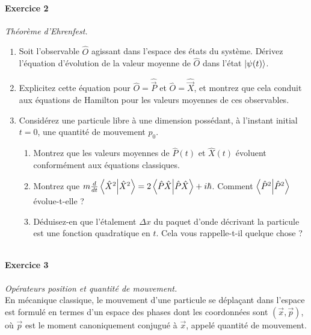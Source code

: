 \newpage

\paragraph{Exercice 2} \textit{Théorème d'Ehrenfest.}
\begin{enumerate}
\item Soit l'observable $\hat O$ agissant dans l'espace des états du système. Dérivez l'équation d'évolution de la valeur moyenne de $\hat O$ dans l'état $\ket{\psi(t)}$.
\item Explicitez cette équation pour $\hat O = \hat{\vec{P}}$ et $\hat O = \hat{\vec{X}}$, et montrez que cela conduit aux équations de Hamilton pour les valeurs moyennes de ces observables. 
\item Considérez une particule libre à une dimension possédant, à l'instant initial $t=0$, une quantité de mouvement $p_0$.
\begin{enumerate}
\item Montrez que les valeurs moyennes de $\hat P(t)$ et $\hat X(t)$ évoluent conformément aux équations classiques.
\item Montrez que $m \frac{d}{dt}\braket{\hat X^2} = 2\braket{\hat P\hat X} + i\hbar$. Comment $\braket{\hat P^2}$ évolue-t-elle ?
\item Déduisez-en que l'étalement $\Delta x$ du paquet d'onde décrivant la particule est une fonction quadratique en $t$. Cela vous rappelle-t-il quelque chose ?
\end{enumerate}
\end{enumerate}
$ $



\paragraph{Exercice 3} \textit{Opérateurs position et quantité de mouvement.} \\
En mécanique classique, le mouvement d'une particule se déplaçant dans l'espace est formulé en termes d'un espace des phases dont les coordonnées sont $(\vec x,\vec p)$, où $\vec p$ est le moment canoniquement conjugué à $\vec x$, appelé quantité de mouvement. \\

